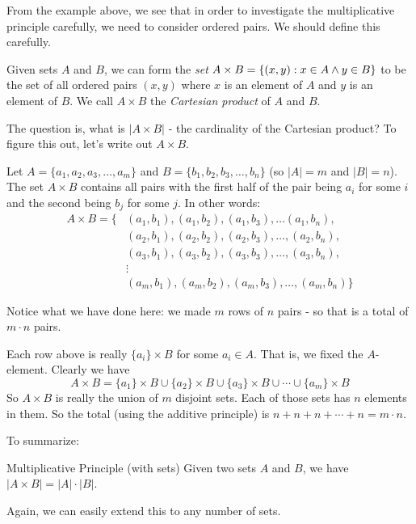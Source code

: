 \documentclass[12pt]{article}
\begin{document}
From the example above, we see that in order to investigate the multiplicative principle carefully, we need to consider ordered pairs.  We should define this carefully.

\begin{definition}
 Given sets $A$ and $B$, we can form the {\em set} $A \times B = \{(x,y) : x \in A \wedge y \in B\}$ to be the set of all ordered pairs $(x,y)$ where $x$ is an element of $A$ and $y$ is an element of $B$.  We call $A \times B$ the {\em Cartesian product} of $A$ and $B$.
\end{definition}

The question is, what is $|A \times B|$ - the cardinality of the Cartesian product?  To figure this out, let's write out $A \times B$.

Let $A = \{a_1,a_2, a_3, \ldots, a_m\}$ and $B = \{b_1,b_2, b_3, \ldots, b_n\}$  (so $|A| = m$ and $|B| = n$).  The set $A \times B$ contains all pairs with the first half of the pair being $a_i$ for some $i$ and the second being $b_j$ for some $j$.  In other words:
\begin{align*}
 A \times B = \{ & (a_1, b_1), (a_1, b_2), (a_1, b_3), \ldots (a_1, b_n), \\
  & (a_2, b_1), (a_2, b_2), (a_2, b_3), \ldots, (a_2, b_n), \\
  & (a_3, b_1), (a_3, b_2), (a_3, b_3), \ldots, (a_3, b_n), \\
  & \vdots \\
  & (a_m, b_1), (a_m, b_2), (a_m, b_3), \ldots, (a_m, b_n)\}
\end{align*}

Notice what we have done here: we made $m$ rows of $n$ pairs - so that is a total of $m \cdot n$ pairs.  

Each row above is really $\{a_i\} \times B$ for some $a_i \in A$.  That is, we fixed the $A$-element.  Clearly we have
\[A \times B = \{a_1\} \times B \cup \{a_2\} \times B \cup \{a_3\}\times B \cup \cdots \cup \{a_m\} \times B\]
So $A \times B$ is really the union of $m$ disjoint sets.  Each of those sets has $n$ elements in them.  So the total (using the additive principle) is $n + n + n + \cdots + n = m \cdot n$.

To summarize:

\begin{defbox}{Multiplicative Principle (with sets)}
 Given two sets $A$ and $B$, we have $|A \times B| = |A| \cdot |B|$.
\end{defbox}

Again, we can easily extend this to any number of sets.
\end{document}
